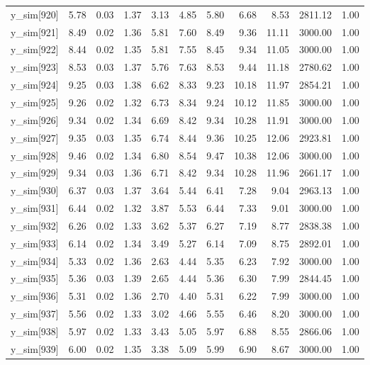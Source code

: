 \begin{table}[ht]
\begin{tabular}{rrrrrrrrrrr}
  y\_sim[920] & 5.78 & 0.03 & 1.37 & 3.13 & 4.85 & 5.80 & 6.68 & 8.53 & 2811.12 & 1.00 \\ 
  y\_sim[921] & 8.49 & 0.02 & 1.36 & 5.81 & 7.60 & 8.49 & 9.36 & 11.11 & 3000.00 & 1.00 \\ 
  y\_sim[922] & 8.44 & 0.02 & 1.35 & 5.81 & 7.55 & 8.45 & 9.34 & 11.05 & 3000.00 & 1.00 \\ 
  y\_sim[923] & 8.53 & 0.03 & 1.37 & 5.76 & 7.63 & 8.53 & 9.44 & 11.18 & 2780.62 & 1.00 \\ 
  y\_sim[924] & 9.25 & 0.03 & 1.38 & 6.62 & 8.33 & 9.23 & 10.18 & 11.97 & 2854.21 & 1.00 \\ 
  y\_sim[925] & 9.26 & 0.02 & 1.32 & 6.73 & 8.34 & 9.24 & 10.12 & 11.85 & 3000.00 & 1.00 \\ 
  y\_sim[926] & 9.34 & 0.02 & 1.34 & 6.69 & 8.42 & 9.34 & 10.28 & 11.91 & 3000.00 & 1.00 \\ 
  y\_sim[927] & 9.35 & 0.03 & 1.35 & 6.74 & 8.44 & 9.36 & 10.25 & 12.06 & 2923.81 & 1.00 \\ 
  y\_sim[928] & 9.46 & 0.02 & 1.34 & 6.80 & 8.54 & 9.47 & 10.38 & 12.06 & 3000.00 & 1.00 \\ 
  y\_sim[929] & 9.34 & 0.03 & 1.36 & 6.71 & 8.42 & 9.34 & 10.28 & 11.96 & 2661.17 & 1.00 \\ 
  y\_sim[930] & 6.37 & 0.03 & 1.37 & 3.64 & 5.44 & 6.41 & 7.28 & 9.04 & 2963.13 & 1.00 \\ 
  y\_sim[931] & 6.44 & 0.02 & 1.32 & 3.87 & 5.53 & 6.44 & 7.33 & 9.01 & 3000.00 & 1.00 \\ 
  y\_sim[932] & 6.26 & 0.02 & 1.33 & 3.62 & 5.37 & 6.27 & 7.19 & 8.77 & 2838.38 & 1.00 \\ 
  y\_sim[933] & 6.14 & 0.02 & 1.34 & 3.49 & 5.27 & 6.14 & 7.09 & 8.75 & 2892.01 & 1.00 \\ 
  y\_sim[934] & 5.33 & 0.02 & 1.36 & 2.63 & 4.44 & 5.35 & 6.23 & 7.92 & 3000.00 & 1.00 \\ 
  y\_sim[935] & 5.36 & 0.03 & 1.39 & 2.65 & 4.44 & 5.36 & 6.30 & 7.99 & 2844.45 & 1.00 \\ 
  y\_sim[936] & 5.31 & 0.02 & 1.36 & 2.70 & 4.40 & 5.31 & 6.22 & 7.99 & 3000.00 & 1.00 \\ 
  y\_sim[937] & 5.56 & 0.02 & 1.33 & 3.02 & 4.66 & 5.55 & 6.46 & 8.20 & 3000.00 & 1.00 \\ 
  y\_sim[938] & 5.97 & 0.02 & 1.33 & 3.43 & 5.05 & 5.97 & 6.88 & 8.55 & 2866.06 & 1.00 \\ 
  y\_sim[939] & 6.00 & 0.02 & 1.35 & 3.38 & 5.09 & 5.99 & 6.90 & 8.67 & 3000.00 & 1.00 \\ 

\end{tabular}
\end{table}
